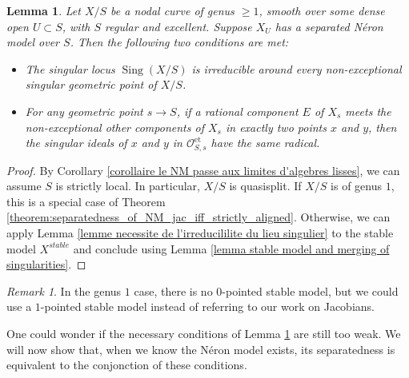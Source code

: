 \documentclass[a4paper,10pt,twoside]{article}
\newcommand{\on}[1]{\operatorname{#1}}
\renewcommand{\O}{\mathcal{O}}
\DeclareMathOperator{\sing}{Sing}
\newtheorem{lem}[thm]{Lemma}
\theoremstyle{definition}
\theoremstyle{remark}
\newtheorem{rem}{Remark}[thm]
\renewcommand{\on}[1]{\operatorname{#1}}
\begin{document}
\begin{lem}\label{lemma:necessary_condition_neron_models_curves}
Let $X/S$ be a nodal curve of genus $\geq 1$, smooth over some dense open $U\subset S$, with $S$ regular and excellent. Suppose $X_U$ has a separated N\'eron model over $S$. Then the following two conditions are met:
\begin{itemize}
\item The singular locus $\sing(X/S)$ is irreducible around every non-exceptional singular geometric point of $X/S$.
\item For any geometric point $s\to S$, if a rational component $E$ of $X_s$ meets the non-exceptional other components of $X_s$ in exactly two points $x$ and $y$, then the singular ideals of $x$ and $y$ in $\O_{S,s}^{\on{et}}$ have the same radical.
\end{itemize}
\end{lem}

\begin{proof}
By Corollary \ref{corollaire le NM passe aux limites d'algebres lisses}, we can assume $S$ is strictly local. In particular, $X/S$ is quasisplit. If $X/S$ is of genus $1$, this is a special case of Theorem \ref{theorem:separatedness_of_NM_jac_iff_strictly_aligned}. Otherwise, we can apply Lemma \ref{lemme necessite de l'irreducililite du lieu singulier} to the stable model $X^{stable}$ and conclude using Lemma \ref{lemma stable model and merging of singularities}.
\end{proof}

\begin{rem}
In the genus $1$ case, there is no $0$-pointed stable model, but we could use a $1$-pointed stable model instead of referring to our work on Jacobians.
\end{rem}

One could wonder if the necessary conditions of Lemma \ref{lemma:necessary_condition_neron_models_curves} are still too weak. We will now show that, when we know the N\'eron model exists, its separatedness is equivalent to the conjonction of these conditions.
\end{document}
